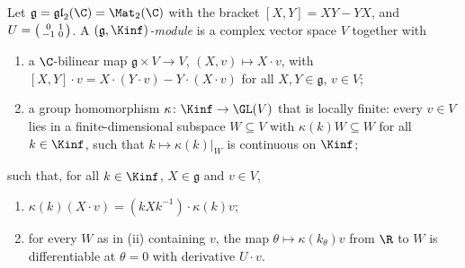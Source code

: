 Let $\mathfrak g=\mathfrak{gl}_2(\C)=\Mat_2(\C)$ with the bracket $[X,Y]=XY-YX$, and $U=\begin{psmallmatrix}0&1\\-1&0\end{psmallmatrix}$.
A \emph{$(\mathfrak g,\Kinf)$-module} is a complex vector space $V$ together with
\begin{enumerate}[label=(\roman*)]
\item a $\C$-bilinear map $\mathfrak g\times V\to V$, $(X,v)\mapsto X\cdot v$, with
  $[X,Y]\cdot v=X\cdot(Y\cdot v)-Y\cdot(X\cdot v)$ for all $X,Y\in\mathfrak g$, $v\in V$;
\item a group homomorphism $\kappa\colon\Kinf\to\GL(V)$ that is locally finite: every $v\in V$ lies in a
  finite-dimensional subspace $W\subseteq V$ with $\kappa(k)W\subseteq W$ for all $k\in\Kinf$, such that
  $k\mapsto\kappa(k)|_W$ is continuous on $\Kinf$;
\end{enumerate}
such that, for all $k\in\Kinf$, $X\in\mathfrak g$ and $v\in V$,
\begin{enumerate}[label=(\roman*),start=3]
\item $\kappa(k)(X\cdot v)=(kXk^{-1})\cdot\kappa(k)v$;
\item for every $W$ as in (ii) containing $v$, the map $\theta\mapsto\kappa(k_\theta)v$ from $\R$ to $W$ is
  differentiable at $\theta=0$ with derivative $U\cdot v$.
\end{enumerate}

